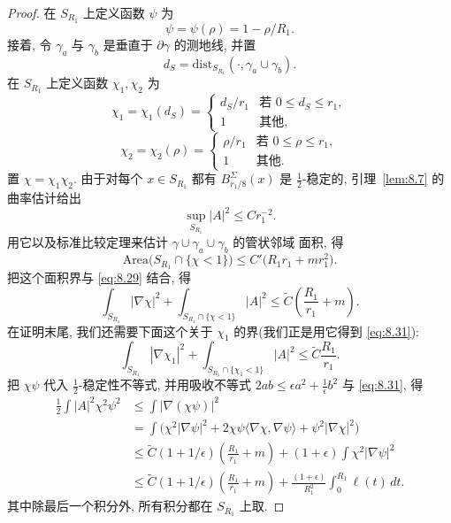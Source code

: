 \begin{proof}
在 $S_{R_1}$ 上定义函数 $\psi$ 为
\[
\psi=\psi(\rho)=1-\rho/R_1.
\]
接着, 令 $\gamma_a$ 与 $\gamma_b$ 是垂直于 $\partial\gamma$ 的测地线, 并置
\[
d_S=\mathrm{dist}_{S_{R_1}}(\cdot,\gamma_a\cup\gamma_b).
\]
在 $S_{R_1}$ 上定义函数 $\chi_1,\chi_2$ 为
\begin{equation}
\chi_1=\chi_1(d_S)=
\begin{cases}
d_S/r_1&\text{若 }0\leq d_S\leq r_1,\\
1&\text{其他},
\end{cases}
\label{eq:8.27}
\end{equation}
\begin{equation}
\chi_2=\chi_2(\rho)=
\begin{cases}
\rho/r_1&\text{若 }0\leq\rho\leq r_1,\\
1&\text{其他}.
\end{cases}
\label{eq:8.28}
\end{equation}
置 $\chi=\chi_1\chi_2$. 由于对每个 $x\in S_{R_1}$ 都有 $B_{r_1/8}^\Sigma(x)$
是 $\frac12$-稳定的, 引理~\ref{lem:8.7} 的曲率估计给出
\begin{equation}
\sup_{S_{R_1}}|A|^2\leq Cr_1^{-2}.
\label{eq:8.29}
\end{equation}
用它以及标准比较定理来估计 $\gamma\cup\gamma_a\cup\gamma_b$ 的管状邻域
面积, 得
\begin{equation}
\mathrm{Area}\bigl(S_{R_1}\cap\{\chi<1\}\bigr)
\leq C'\bigl(R_1r_1+mr_1^2\bigr).
\label{eq:8.30}
\end{equation}
把这个面积界与 \eqref{eq:8.29} 结合, 得
\begin{equation}
\int_{S_{R_1}}|\nabla\chi|^2
+\int_{S_{R_1}\cap\{\chi<1\}}|A|^2
\leq\tilde C\left(\frac{R_1}{r_1}+m\right).
\label{eq:8.31}
\end{equation}
在证明末尾, 我们还需要下面这个关于 $\chi_1$ 的界(我们正是用它得到
\eqref{eq:8.31}):
\begin{equation}
\int_{S_{R_1}}|\nabla\chi_1|^2
+\int_{S_{R_1}\cap\{\chi_1<1\}}|A|^2
\leq\tilde C\frac{R_1}{r_1}.
\label{eq:8.32}
\end{equation}
把 $\chi\psi$ 代入 $\frac12$-稳定性不等式, 并用吸收不等式
$2ab\leq\epsilon a^2+\frac1\epsilon b^2$ 与 \eqref{eq:8.31}, 得
\begin{equation}
\begin{aligned}
\frac12\int|A|^2\chi^2\psi^2
&\leq\int|\nabla(\chi\psi)|^2\\
&=\int\bigl(\chi^2|\nabla\psi|^2
+2\chi\psi\langle\nabla\chi,\nabla\psi\rangle
+\psi^2|\nabla\chi|^2\bigr)\\
&\leq\tilde C(1+1/\epsilon)\left(\frac{R_1}{r_1}+m\right)
+(1+\epsilon)\int\chi^2|\nabla\psi|^2\\
&\leq\tilde C(1+1/\epsilon)\left(\frac{R_1}{r_1}+m\right)
+\frac{(1+\epsilon)}{R_1^2}\int_0^{R_1}\ell(t)\,dt.
\label{eq:8.33}
\end{aligned}
\end{equation}
其中除最后一个积分外, 所有积分都在 $S_{R_1}$ 上取.


\end{proof}
